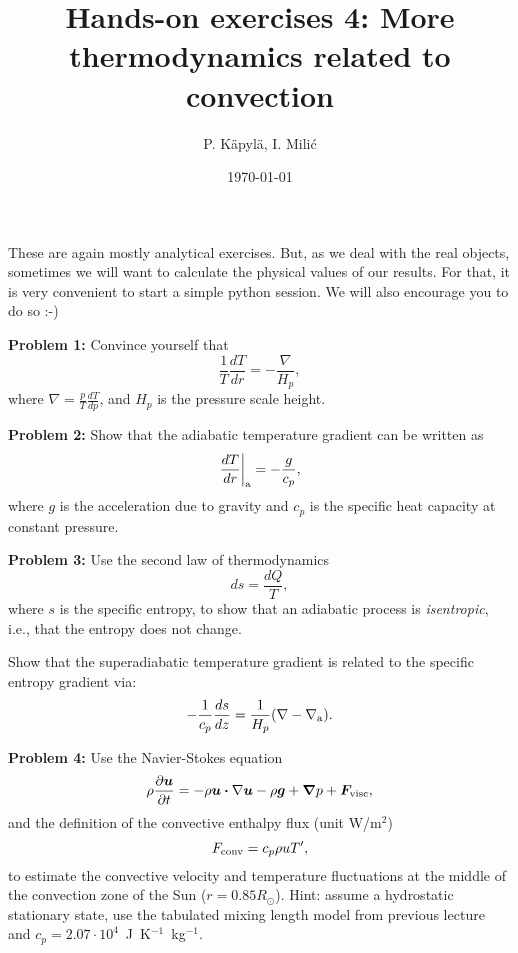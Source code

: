\documentclass[12pt]{article}
\title{Hands-on exercises 4: More thermodynamics related to convection}
\author{P. K\"{a}pyl\"{a}, I. Mili\'{c}}
\date{\today}
\begin{document}
\maketitle

These are again mostly analytical exercises. But, as we deal with the
real objects, sometimes we will want to calculate the physical values
of our results. For that, it is very convenient to start a simple
python session. We will also encourage you to do so :-)

{\bf Problem 1:} Convince yourself that
\begin{equation}
\frac{1}{T}\frac{dT}{dr} = - \frac{\nabla}{H_p},
\end{equation}
where $\nabla = \frac{p}{T}\frac{dT}{dp}$, and $H_p$ is the pressure
scale height.

{\bf Problem 2:} Show that the adiabatic temperature gradient can be
written as
\begin{equation}
\left.\frac{dT}{dr}\right|_{\rm a} = -\frac{g}{c_p},
\end{equation}
where $g$ is the acceleration due to gravity and $c_p$ is the specific
heat capacity at constant pressure.

{\bf Problem 3:} Use the second law of thermodynamics
\begin{equation}
ds = \frac{dQ}{T},
\end{equation}
where $s$ is the specific entropy, to show that an adiabatic process
is \emph{isentropic}, i.e., that the entropy does not change.

Show that the superadiabatic temperature gradient is related to the
specific entropy gradient via:
\begin{equation}
-\frac{1}{c_p} \frac{ds}{dz} = \frac{1}{H_p} (\nabla - \nabla_{\rm a}).
\end{equation}

{\bf Problem 4:} Use the Navier-Stokes equation
\begin{equation}
\rho\frac{\partial {\bm u}}{\partial t} = - \rho{\bm u}\bm\cdot\nabla{\bm u} - \rho {\bm g} + \bm\nabla p + {\bm F}_{\rm visc},
\end{equation}
and the definition of the convective enthalpy flux (unit W/m$^2$)
\begin{equation}
F_{\rm conv} = c_p \rho u T',
\end{equation}
to estimate the convective velocity and temperature fluctuations at
the middle of the convection zone of the Sun ($r=0.85R_\odot$). Hint:
assume a hydrostatic stationary state, use the tabulated mixing length
model from previous lecture and $c_p =
2.07\cdot10^4$~J~K$^{-1}$~kg$^{-1}$.
\end{document}
